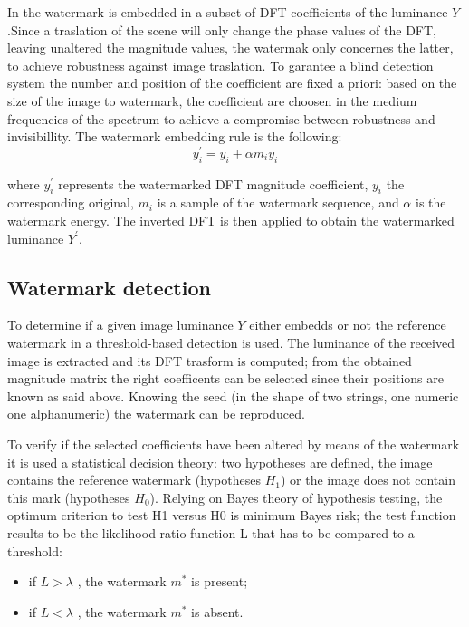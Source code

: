 In \cite{PIVA} the watermark is embedded in a subset of DFT coefficients of the luminance $Y$.\newline Since a traslation of the scene will only change the phase values of the DFT, leaving unaltered the magnitude values, the watermak only concernes the latter, to achieve robustness against image traslation.\newline
To garantee a blind detection system the number and position of the coefficient are fixed a priori: based on the size of the image to watermark, the coefficient are choosen in the medium frequencies of the spectrum to achieve a compromise between robustness and invisibillity.\newline 
The watermark embedding rule is the following:
\begin{equation}\label{eq:wat}
y_{i}^{'} = y_{i}+\alpha m_{i}y_{i} 
\end{equation}

where $y_{i}^{'}$ represents the watermarked DFT magnitude coefficient, $y_{i}$ the corresponding original, $m_{i}$ is a sample of the watermark sequence, and $\alpha$ is the watermark energy.\newline
The inverted DFT is then applied to obtain the watermarked luminance $Y^{'}$.

\subsection{Watermark detection}

To determine if a given image luminance $Y$ either embedds or not the reference watermark in \cite{PIVA} a threshold-based detection is used.\newline
The luminance of the received image is extracted and its DFT trasform is computed; from the obtained magnitude matrix the right coefficents can be selected since their positions are known as said above.\newline
Knowing the seed (in the shape of two strings, one numeric one alphanumeric) the watermark can be reproduced.\newline

To verify if the selected coefficients have been altered by means of the watermark it is used a statistical decision theory: two hypotheses are defined, the image contains the reference watermark (hypotheses $H_{1}$) or the image does not contain this mark (hypotheses $H_{0}$). Relying on Bayes theory of hypothesis testing, the optimum criterion to test H1 versus H0 is minimum Bayes risk; the test function results to be the likelihood ratio function L that has to be compared to a threshold:\newline
\begin{itemize}
\item if $L > \lambda$ ,  the watermark $m^{*}$ is present;
\item if $L < \lambda$ , the watermark  $m^{*}$ is absent.
\end{itemize}

